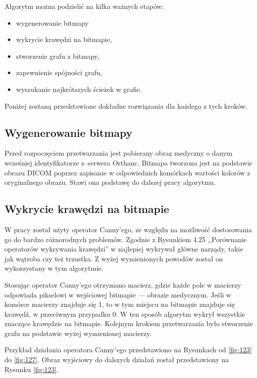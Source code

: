 \documentclass[a4paper,11pt,twoside,openright]{report}
\theoremstyle{definition}
\begin{document}
Algorytm można podzielić na kilka ważnych etapów:

\begin{itemize}[noitemsep]
\item {wygenerowanie bitmapy}
\item {wykrycie krawędzi na bitmapie,}
\item {stworzenie grafu z bitmapy,}
\item {zapewnienie spójności grafu,}
\item {wyszukanie najkrótszych ścieżek w grafie.}
\end{itemize}

Poniżej zostaną przedstawione dokładne rozwiązania dla każdego z tych kroków.

\subsection {Wygenerowanie bitmapy}

Przed rozpoczęciem przetwarzania jest pobierany obraz medyczny o danym wcześniej
identyfikatorze z~serwera Orthanc. Bitmapa tworzona jest na podstawie obrazu DICOM poprzez
zapisanie w odpowiednich komórkach wartości kolorów z oryginalnego obrazu.
Stawi ona podstawę do dalszej pracy algorytmu.

\subsection {Wykrycie krawędzi na bitmapie}

W pracy został użyty operator Canny'ego, ze względu na możliwość dostosowania go
do bardzo różnorodnych problemów. Zgodnie z Rysunkiem 4.25 %
,,Porównanie operatorów wykrywania krawędzi'' w \cite{Cyfrowe przetwarzanie obrazów medycznych}
najlepiej wykrywał główne narządy, takie jak wątroba czy też trzustka. Z wyżej
wymienionych powodów został on wykorzystany w tym algorytmie.

Stosując operator Canny'ego otrzymano macierz, gdzie każde pole w macierzy odpowiada pikselowi
w wejściowej bitmapie --- obrazie medycznym. Jeśli w komórce macierzy znajduje
się 1, to w tym miejscu na bitmapie znajduje się krawędź, w przeciwnym przypadku
0. W ten sposób algorytm wykrył wszystkie znaczące krawędzie na bitmapie. Kolejnym
krokiem przetwarzania było stworzenie grafu na podstawie wyżej wymienionej macierzy.

Przykład działania operatora Canny'ego przedstawiono na Rysunkach od \ref{fig:123} do \ref{fig:127}. 
Obraz wyjściowy do dalszych działań został przedstawiony na Rysunku \ref{fig:123}.
\end{document}
